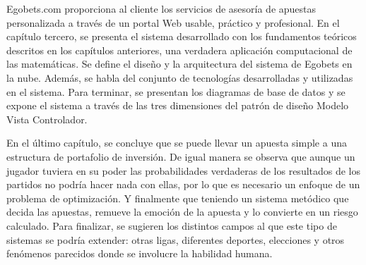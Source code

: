 Egobets.com proporciona al cliente los servicios de asesoría de apuestas personalizada a través de un portal Web usable, práctico y profesional. En el capítulo tercero, se presenta el sistema desarrollado con los fundamentos teóricos descritos en los capítulos anteriores, una verdadera aplicación computacional de las matemáticas. Se define el diseño y la arquitectura del sistema de Egobets en la nube. Además, se habla del conjunto de tecnologías desarrolladas y utilizadas en el sistema. Para terminar, se presentan los diagramas de base de datos y se expone el sistema a través de las tres dimensiones del patrón de diseño Modelo Vista Controlador. 

En el último capítulo, se concluye que se puede llevar un apuesta simple a una estructura de portafolio de inversión. De igual manera se observa que aunque un jugador tuviera en su poder las probabilidades verdaderas de los resultados de los partidos no podría hacer nada con ellas, por lo que es necesario un enfoque de un problema de optimización. Y finalmente que teniendo un sistema metódico que decida las apuestas, remueve la emoción de la apuesta y lo convierte en un riesgo calculado. Para finalizar, se sugieren los distintos campos al que este tipo de sistemas se podría extender: otras ligas, diferentes deportes, elecciones y otros fenómenos parecidos donde se involucre la habilidad humana.



